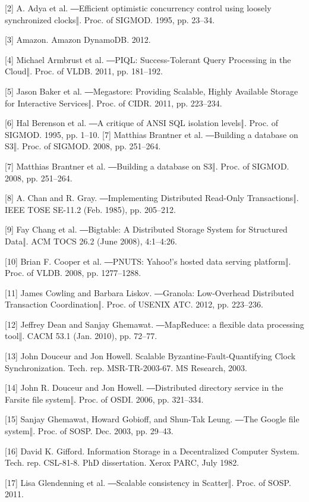 \documentclass[letterpaper,twocolumn,10pt]{article}
\begin{document}
[2] A. Adya et al. ―Efficient optimistic concurrency control using loosely synchronized clocks‖. Proc. of SIGMOD. 1995, pp. 23–34.

[3] Amazon. Amazon DynamoDB. 2012.

[4] Michael Armbrust et al. ―PIQL: Success-Tolerant Query Processing in the Cloud‖. Proc. of VLDB. 2011, pp. 
181–192.

[5] Jason Baker et al. ―Megastore: Providing Scalable, Highly Available Storage for Interactive Services‖. Proc. of CIDR. 2011, pp. 223–234.

[6] Hal Berenson et al. ―A critique of ANSI SQL isolation levels‖. Proc. of SIGMOD. 1995, pp. 1–10. [7] Matthias Brantner et al. ―Building a database on S3‖. Proc. of SIGMOD. 2008, pp. 251–264.

[7] Matthias Brantner et al. ―Building a database on S3‖. Proc. of SIGMOD. 2008, pp. 251–264.

[8] A. Chan and R. Gray. ―Implementing Distributed Read-Only Transactions‖. IEEE TOSE SE-11.2 (Feb. 1985), pp. 205–212.

[9] Fay Chang et al. ―Bigtable: A Distributed Storage System for Structured Data‖. ACM TOCS 26.2 (June 2008), 4:1–4:26.

[10] Brian F. Cooper et al. ―PNUTS: Yahoo!’s hosted data serving platform‖. Proc. of VLDB. 2008, pp. 1277–1288.

[11] James Cowling and Barbara Liskov. ―Granola: Low-Overhead Distributed Transaction Coordination‖. Proc. of USENIX ATC. 2012, pp. 223–236.

[12] Jeffrey Dean and Sanjay Ghemawat. ―MapReduce: a flexible data processing tool‖. CACM 53.1 (Jan. 2010), pp. 72–77.

[13] John Douceur and Jon Howell. Scalable Byzantine-Fault-Quantifying Clock Synchronization. Tech. rep. MSR-TR-2003-67. MS Research, 2003.

[14] John R. Douceur and Jon Howell. ―Distributed directory service in the Farsite file system‖. Proc. of OSDI. 2006, pp. 321–334.

[15] Sanjay Ghemawat, Howard Gobioff, and Shun-Tak Leung. ―The Google file system‖. Proc. of SOSP. Dec. 2003, pp. 29–43.

[16] David K. Gifford. Information Storage in a Decentralized Computer System. Tech. rep. CSL-81-8. PhD dissertation. Xerox PARC, July 1982.

[17] Lisa Glendenning et al. ―Scalable consistency in Scatter‖. Proc. of SOSP. 2011.
\end{document}
